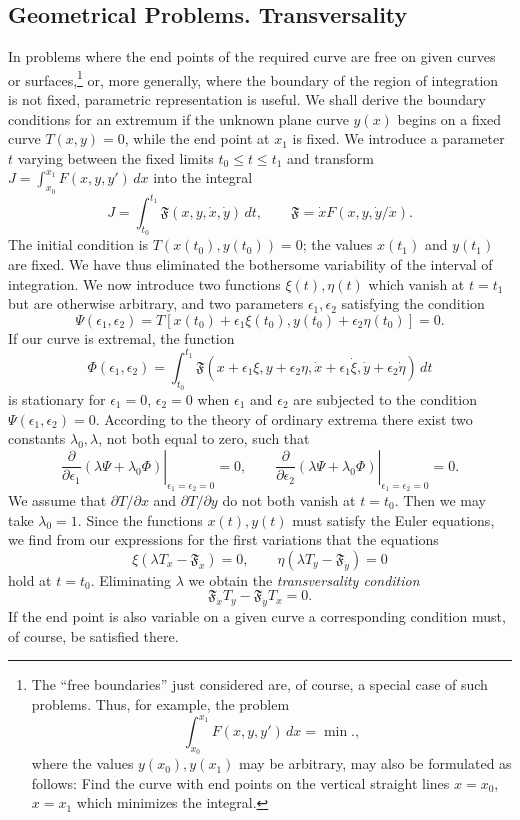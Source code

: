 \subsection{Geometrical Problems. Transversality}
In problems where the end points of the required curve are free on given curves or surfaces,\footnote{The ``free boundaries'' just considered are, of course, a special case of such problems. Thus, for example, the problem
\[
\int_{x_0}^{x_1}F(x,y,y')\,dx=\min.,
\]
where the values $y(x_0),y(x_1)$ may be arbitrary, may also be formulated as follows: Find the curve with end points on the vertical straight lines $x=x_0$, $x=x_1$ which minimizes the integral.} or, more generally, where the boundary of the region of integration is not fixed, parametric representation is useful. We shall derive the boundary conditions for an extremum if the unknown plane curve $y(x)$ begins on a fixed curve $T(x,y)=0$, while the end point at $x_1$ is fixed. We introduce a parameter $t$ varying between the fixed limits $t_0\le t\le t_1$ and transform $J=\int_{x_0}^{x_1}F(x,y,y')\,dx$ into the integral
\[
J=\int_{t_0}^{t_1}\mathfrak F(x,y,\dot x,\dot y)\,dt,
\qquad
\mathfrak F=\dot xF(x,y,\dot y/\dot x).
\]
The initial condition is $T(x(t_0),y(t_0))=0$; the values $x(t_1)$ and $y(t_1)$ are fixed. We have thus eliminated the bothersome variability of the interval of integration. We now introduce two functions $\xi(t),\eta(t)$ which vanish at $t=t_1$ but are otherwise arbitrary, and two parameters $\epsilon_1,\epsilon_2$ satisfying the condition
\[
\Psi(\epsilon_1,\epsilon_2)
=T[x(t_0)+\epsilon_1\xi(t_0),y(t_0)+\epsilon_2\eta(t_0)]=0.
\]
If our curve is extremal, the function
\[
\Phi(\epsilon_1,\epsilon_2)
=\int_{t_0}^{t_1}\mathfrak F(x+\epsilon_1\xi,y+\epsilon_2\eta,
\dot x+\epsilon_1\dot\xi,\dot y+\epsilon_2\dot\eta)\,dt
\]
is stationary for $\epsilon_1=0$, $\epsilon_2=0$ when $\epsilon_1$ and $\epsilon_2$ are subjected to the condition $\Psi(\epsilon_1,\epsilon_2)=0$. According to the theory of ordinary extrema there exist two constants $\lambda_0,\lambda$, not both equal to zero, such that
\[
\left.\frac{\partial}{\partial\epsilon_1}(\lambda\Psi+\lambda_0\Phi)\right|_{\epsilon_1=\epsilon_2=0}=0,
\qquad
\left.\frac{\partial}{\partial\epsilon_2}(\lambda\Psi+\lambda_0\Phi)\right|_{\epsilon_1=\epsilon_2=0}=0.
\]
We assume that $\partial T/\partial x$ and $\partial T/\partial y$ do not both vanish at $t=t_0$. Then we may take $\lambda_0=1$. Since the functions $x(t),y(t)$ must satisfy the Euler equations, we find from our expressions for the first variations that the equations
\[
\xi(\lambda T_x-\mathfrak F_{\dot x})=0,
\qquad
\eta(\lambda T_y-\mathfrak F_{\dot y})=0
\]
hold at $t=t_0$. Eliminating $\lambda$ we obtain the \emph{transversality condition}
\begin{equation}\tag{46}
\mathfrak F_{\dot x}T_y-\mathfrak F_{\dot y}T_x=0.
\end{equation}
If the end point is also variable on a given curve a corresponding condition must, of course, be satisfied there.

